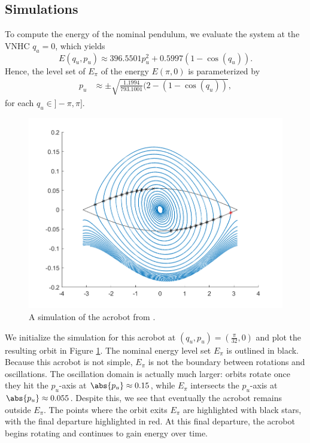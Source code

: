 \subsection{Simulations}

To compute the energy of the nominal pendulum, we evaluate the system at the
VNHC \(q_a = 0\), which yields
\[
    E(q_u,p_u) \approx 396.5501 p_u^2 + 0.5997(1 - \cos(q_u))
    .
\]
Hence, the level set of \(E_\pi\) of the energy \(E(\pi,0)\) is parameterized by
\begin{align*}
    p_u &\approx \pm \sqrt{\frac{1.1994}{793.1001}(2 - (1 - \cos(q_u))}
    ,
\end{align*}
for each \(q_u \in ]-\pi,\pi]\).

\begin{figure}[ht]
    \centering
    \includegraphics[width=0.8\linewidth]{images/acrobot_orbit.png}
    \caption{A simulation of the acrobot from \cite{xingbo_thesis}.}
    \label{fig:acrobot-orbit}
\end{figure}

We initialize the simulation for this acrobot at 
\((q_u,p_u) = \left(\frac{\pi}{32},0 \right)\) and plot the resulting orbit in 
Figure \ref{fig:acrobot-orbit}.
The nominal energy level set \(E_\pi\) is outlined in black. 
Because this acrobot is not simple, \(E_\pi\) is not the boundary between
rotations and oscillations.
The oscillation domain is actually much larger: orbits rotate once they hit the
\(p_u\)-axis at \(\abs{p_u} \approx 0.15\), while \(E_\pi\) intersects the
\(p_u\)-axis at \(\abs{p_u} \approx 0.055\).
Despite this, we see that eventually the acrobot remains outside \(E_\pi\).
The points where the orbit exits \(E_\pi\) are highlighted with black stars,
with the final departure highlighted in red.
At this final departure, the acrobot begins rotating and continues to gain
energy over time.

